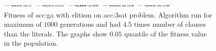 \begin{figure}[ht!]
    \begin{minipage}{\textwidth}
        \centering
        \includegraphics[width=0.8\textwidth]{img/runs/fitness_ga_3SAT_legend.pdf}
    \end{minipage}

    \caption[Fitness of genetic algorithm with elitism]{Fitness of \acrlong{acc:ga} with elitism on \acrshort{acc:3sat} problem. Algorithm run for maximum of $1000$ generations and had $4.5$ times number of clauses than the literals. The graphs show $0.05$ quantile of the fitness value in the population.}
    \label{meas:gafitnesselite}
\end{figure}






